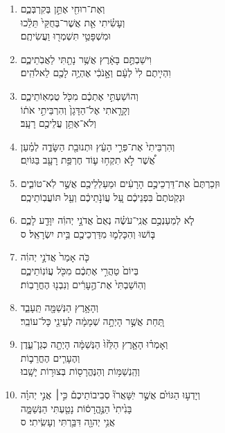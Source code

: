 \documentclass[12pt,a4paper,titlepage]{article}
\def \pslabelsep{-0.9em} %
\def \psleftmargin{0em} %
\begin{document}
\begin{enumerate}[leftmargin=\psleftmargin, labelsep = \pslabelsep, label={\arabic*}, font=\color{\pscolor}\small\textsuperscript, parsep=0em, itemsep=0em, topsep=0em ]
\item \texthebrew{וְאֶת־רוּחִ֖י אֶתֵּ֣ן בְּקִרְבְּכֶ֑ם \\ וְעָשִׂ֗יתִי אֵ֤ת אֲשֶׁר־בְּחֻקַּי֙ תֵּלֵ֔כוּ \\ וּמִשְׁפָּטַ֥י תִּשְׁמְר֖וּ וַעֲשִׂיתֶֽם׃}
\item \texthebrew{וִישַׁבְתֶּ֣ם בָּאָ֔רֶץ אֲשֶׁ֥ר נָתַ֖תִּי לַאֲבֹֽתֵיכֶ֑ם \\ וִהְיִ֤יתֶם לִי֙ לְעָ֔ם וְאָ֣נֹכִ֔י אֶהְיֶ֥ה לָכֶ֖ם לֵאלֹהִֽים׃}
\item \texthebrew{וְהוֹשַׁעְתִּ֣י אֶתְכֶ֔ם מִכֹּ֖ל טֻמְאֽוֹתֵיכֶ֑ם \\ וְקָרָ֤אתִי אֶל־הַדָּגָן֙ וְהִרְבֵּיתִ֣י אֹת֔וֹ \\ וְלֹא־אֶתֵּ֥ן עֲלֵיכֶ֖ם רָעָֽב׃}
\item \texthebrew{וְהִרְבֵּיתִי֙ אֶת־פְּרִ֣י הָעֵ֔ץ וּתְנוּבַ֖ת הַשָּׂדֶ֑ה לְמַ֗עַן \\ אֲ֠שֶׁר לֹ֣א תִקְח֥וּ ע֛וֹד חֶרְפַּ֥ת רָעָ֖ב בַּגּוֹיִֽם׃}
\item \texthebrew{וּזְכַרְתֶּם֙ אֶת־דַּרְכֵיכֶ֣ם הָרָעִ֔ים וּמַעַלְלֵיכֶ֖ם אֲשֶׁ֣ר לֹֽא־טוֹבִ֑ים \\ וּנְקֹֽטֹתֶם֙ בִּפְנֵיכֶ֔ם עַ֚ל עֲוֹנֹ֣תֵיכֶ֔ם וְעַ֖ל תּוֹעֲבֽוֹתֵיכֶֽם׃}
\item \texthebrew{לֹ֧א לְמַעַנְכֶ֣ם אֲנִֽי־עֹשֶׂ֗ה נְאֻם֙ אֲדֹנָ֣י יְהוִ֔ה יִוָּדַ֖ע לָכֶ֑ם \\ בּ֧וֹשׁוּ וְהִכָּלְמ֛וּ מִדַּרְכֵיכֶ֖ם בֵּ֥ית יִשְׂרָאֵֽל׃ ס} \parSpace
\item \texthebrew{כֹּ֤ה אָמַר֙ אֲדֹנָ֣י יְהוִ֔ה \\ בְּיוֹם֙ טַהֲרִ֣י אֶתְכֶ֔ם מִכֹּ֖ל עֲוֹנֽוֹתֵיכֶ֑ם \\ וְהֽוֹשַׁבְתִּי֙ אֶת־הֶ֣עָרִ֔ים וְנִבְנ֖וּ הֶחֳרָבֽוֹת׃}
\item \texthebrew{וְהָאָ֥רֶץ הַנְּשַׁמָּ֖ה תֵּֽעָבֵ֑ד \\ תַּ֚חַת אֲשֶׁ֣ר הָיְתָ֣ה שְׁמָמָ֔ה לְעֵינֵ֖י כָּל־עוֹבֵֽר׃}
\item \texthebrew{וְאָמְר֗וּ הָאָ֤רֶץ הַלֵּ֙זוּ֙ הַנְּשַׁמָּ֔ה הָיְתָ֖ה כְּגַן־עֵ֑דֶן \\ וְהֶעָרִ֧ים הֶחֳרֵב֛וֹת \\ וְהַֽנְשַׁמּ֥וֹת וְהַנֶּהֱרָס֖וֹת בְּצוּר֥וֹת יָשָֽׁבוּ׃}
\item \texthebrew{וְיָדְע֣וּ הַגּוֹיִ֗ם אֲשֶׁ֣ר יִֽשָּׁאֲרוּ֘ סְבִיבוֹתֵיכֶם֒ כִּ֣י׀ אֲנִ֣י יְהוָ֗ה \\ בָּנִ֙יתִי֙ הַנֶּ֣הֱרָס֔וֹת נָטַ֖עְתִּי הַנְּשַׁמָּ֑ה \\ אֲנִ֥י יְהוָ֖ה דִּבַּ֥רְתִּי וְעָשִֽׂיתִי׃ ס}\parSpace

\end{enumerate}
\end{document}
